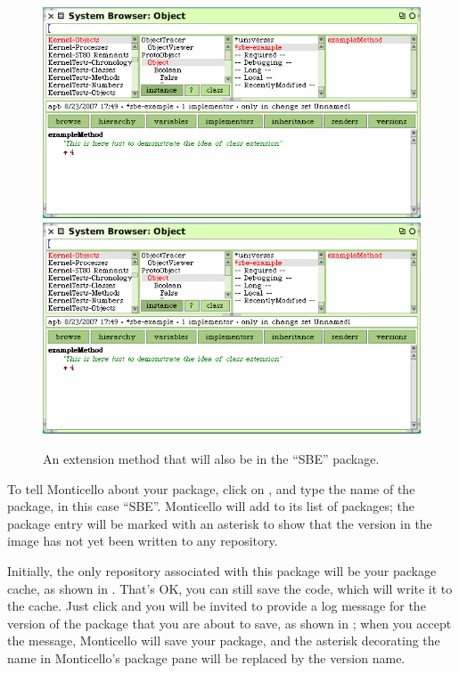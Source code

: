 \documentclass[a4paper,10pt,twoside]{book}
\begin{document}
\begin{figure}[btp]
	\begin{center}
	\ifluluelse
		{\includegraphics[width=\textwidth]{MCnewmethod}}
		{\includegraphics[scale=0.7]{MCnewmethod}}
	\end{center}
	\caption{An extension method that will also be in the ``SBE'' package.}
	\label{fig:MCnewmethod}
\end{figure}

To tell Monticello about your package, click on , and type the name of the package, in this case ``SBE''.  Monticello will add  to its list of packages; the package entry will be marked with an asterisk to show that the version in the image has not yet been written to any repository.

Initially, the only repository associated with this package will be your package cache, as shown in .  That's OK, you can still save the code, which will write it to the cache.  
Just click  and you will be invited to provide a log message for the version of the package that you are about to save, as shown in ; when you accept the message, Monticello will save your package, and the asterisk decorating the name in Monticello's package pane will be replaced by the version name.
\end{document}
